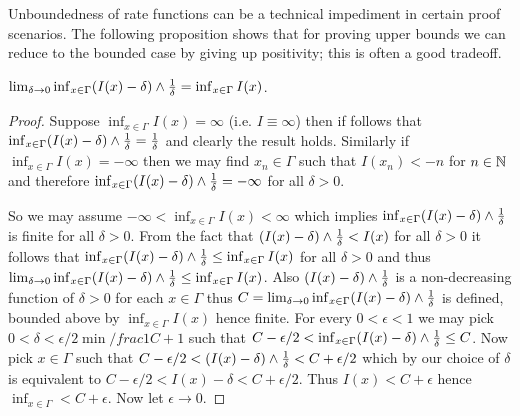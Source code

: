 Unboundedness of rate functions can be a technical impediment in certain proof scenarios.  The following proposition shows that for proving upper bounds we can reduce to the bounded case by giving up positivity; this is often a good tradeoff.
\begin{prop}$\lim_{\delta \to 0} \inf_{x \in \Gamma} (I(x) - \delta) \wedge \frac{1}{\delta} = \inf_{x \in \Gamma} I(x)$.
\end{prop}
\begin{proof}
Suppose $\inf_{x \in \Gamma} I(x) = \infty$ (i.e. $I \equiv \infty$) then if follows that $\inf_{x \in \Gamma} (I(x) - \delta) \wedge \frac{1}{\delta} = \frac{1}{\delta}$ and clearly the result holds.  Similarly if $\inf_{x \in \Gamma} I(x) = -\infty$ then we may find $x_n \in \Gamma$ such that $I(x_n) < -n$ for $n \in \mathbb{N}$ and therefore $\inf_{x \in \Gamma} (I(x) - \delta) \wedge \frac{1}{\delta} = -\infty$ for all $\delta > 0$.  

So we may assume $-\infty < \inf_{x \in \Gamma} I(x) < \infty$ which implies $\inf_{x \in \Gamma} (I(x) - \delta) \wedge \frac{1}{\delta}$ is finite for all $\delta>0$.  From the fact that $ (I(x) - \delta) \wedge \frac{1}{\delta} < I(x)$ for all $\delta > 0$ it follows that $\inf_{x \in \Gamma} (I(x) - \delta) \wedge \frac{1}{\delta} \leq \inf_{x \in \Gamma} I(x)$ for all $\delta > 0$ and thus $\lim_{\delta \to 0} \inf_{x \in \Gamma} (I(x) - \delta) \wedge \frac{1}{\delta} \leq \inf_{x \in \Gamma} I(x)$.  Also $(I(x) - \delta) \wedge \frac{1}{\delta}$ is a non-decreasing function of $\delta>0$ for each $x \in \Gamma$ thus $C=\lim_{\delta \to 0} \inf_{x \in \Gamma} (I(x) - \delta) \wedge \frac{1}{\delta}$ is defined, bounded above by $\inf_{x \in \Gamma} I(x)$ hence finite.  For every $0 < \epsilon < 1$ we may pick $0 < \delta < \epsilon/2 \min /frac{1}{C+1}$ such that $C - \epsilon/2 < \inf_{x \in \Gamma} (I(x) - \delta) \wedge \frac{1}{\delta} \leq C$.  Now pick $x \in \Gamma$ such that $C- \epsilon/2 < (I(x) - \delta) \wedge \frac{1}{\delta} < C + \epsilon/2$ which by our choice of $\delta$ is equivalent to $C- \epsilon/2 < I(x) - \delta < C + \epsilon/2$.  Thus $I(x) < C + \epsilon$ hence $\inf_{x \in \Gamma} < C + \epsilon$.  Now let $\epsilon \to 0$.
\end{proof}

